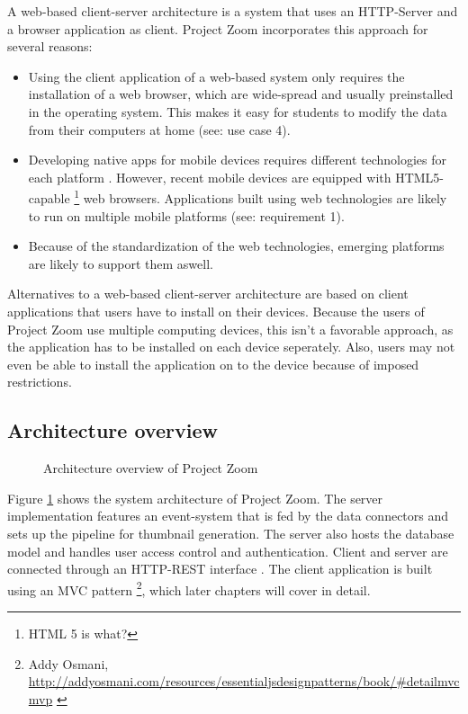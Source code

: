 A web-based client-server architecture is a system that uses an HTTP-Server \cite{RFC2616} and a browser application as client. Project Zoom incorporates this approach for several reasons:
\begin{itemize}
\item Using the client application of a web-based system only requires the installation of a web browser, which are wide-spread and usually preinstalled in the operating system. This makes it easy for students to modify the data from their computers at home (see: use case 4).
\item Developing native apps for mobile devices requires different technologies for each platform \cite{Charland_2011}. However, recent mobile devices are equipped with HTML5-capable \footnote{HTML 5 is what?} web browsers. Applications built using web technologies are likely to run on multiple mobile platforms (see: requirement 1).
\item Because of the standardization of the web technologies, emerging platforms are likely to support them aswell.
\end{itemize}

Alternatives to a web-based client-server architecture are based on client applications that users have to install on their devices. Because the users of Project Zoom use multiple computing devices, this isn't a favorable approach, as the application has to be installed on each device seperately. Also, users may not even be able to install the application on to the device because of imposed restrictions.

\subsection{Architecture overview}

\begin{figure}
\caption{Architecture overview of Project Zoom}
\label{fig:CompleteArchitectureDiagram}
\end{figure}

Figure \ref{fig:CompleteArchitectureDiagram} shows the system architecture of Project Zoom. The server implementation features an event-system that is fed by the data connectors and sets up the pipeline for thumbnail generation. The server also hosts the database model and handles user access control and authentication. Client and server are connected through an HTTP-REST interface \cite{Fielding_2000}. The client application is built using an MVC pattern \footnote{Addy Osmani, \url{http://addyosmani.com/resources/essentialjsdesignpatterns/book/\#detailmvcmvp} \cite{Osmani_2012}}, which later chapters will cover in detail. 

